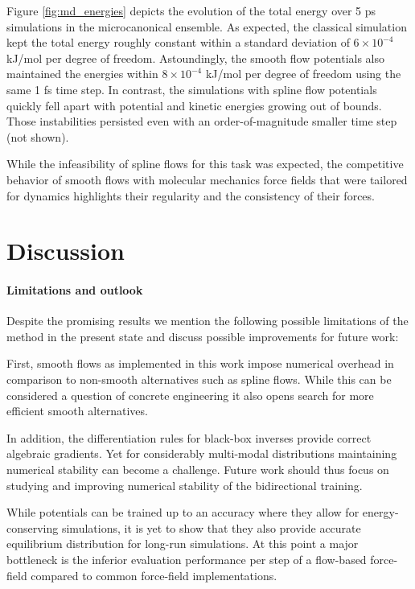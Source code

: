 \documentclass{article}
\newcommand{\andreas}[1]{{\color{blue} \textbf{andreas:} #1}}
\begin{document}
Figure \ref{fig:md_energies} depicts the evolution of the total energy over 5 ps simulations in the microcanonical ensemble. As expected, the classical simulation kept the total energy roughly constant within a standard deviation of $6\times 10^{-4}$ kJ/mol per degree of freedom. Astoundingly, the smooth flow potentials also maintained the energies within $8\times 10^{-4}$ kJ/mol per degree of freedom using the same 1 fs time step. In contrast, the simulations with spline flow potentials quickly fell apart with potential and kinetic energies growing out of bounds. Those instabilities persisted even with an order-of-magnitude smaller time step (not shown).

While the infeasibility of spline flows for this task was expected, the competitive behavior of smooth flows with molecular mechanics force fields that were tailored for dynamics highlights their regularity and the consistency of their forces. 


\section{Discussion}

\paragraph{Limitations and outlook}
Despite the promising results we mention the following possible limitations of the method in the present state and discuss possible improvements for future work:

    First, smooth flows as implemented in this work impose numerical overhead in comparison to non-smooth alternatives such as spline flows. While this can be considered a question of concrete engineering it also opens search for more efficient smooth alternatives.
    
    In addition, the differentiation rules for black-box inverses provide correct algebraic gradients. Yet for considerably multi-modal distributions maintaining numerical stability can become a challenge. Future work should thus focus on studying and improving numerical stability of the bidirectional training.
    
    While potentials can be trained up to an accuracy where they allow for energy-conserving simulations, it is yet to show that they also provide accurate equilibrium distribution for long-run simulations. At this point a major bottleneck is the inferior evaluation performance per step of a flow-based force-field compared to common force-field implementations.
    
\end{document}
